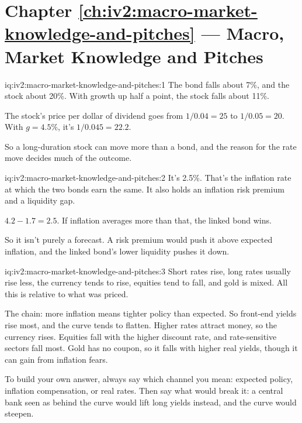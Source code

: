 \section*{Chapter \ref{ch:iv2:macro-market-knowledge-and-pitches} --- Macro, Market Knowledge and Pitches}

\begin{solution}{iq:iv2:macro-market-knowledge-and-pitches:1}
The bond falls about 7\%, and the stock about 20\%. With growth up half a point, the stock falls about 11\%.

The stock's price per dollar of dividend goes from $1/0.04 = 25$ to $1/0.05 = 20$. With $g = 4.5\%$, it's $1/0.045 = 22.2$.

So a long-duration stock can move more than a bond, and the reason for the rate move decides much of the outcome.

\end{solution}

\begin{solution}{iq:iv2:macro-market-knowledge-and-pitches:2}
It's 2.5\%. That's the inflation rate at which the two bonds earn the same. It also holds an inflation risk premium and a liquidity gap.

$4.2 - 1.7 = 2.5$. If inflation averages more than that, the linked bond wins.

So it isn't purely a forecast. A risk premium would push it above expected inflation, and the linked bond's lower liquidity pushes it down.

\end{solution}

\begin{solution}{iq:iv2:macro-market-knowledge-and-pitches:3}
Short rates rise, long rates usually rise less, the currency tends to rise, equities tend to fall, and gold is mixed. All this is relative to what was priced.

The chain: more inflation means tighter policy than expected. So front-end yields rise most, and the curve tends to flatten. Higher rates attract money, so the currency rises. Equities fall with the higher discount rate, and rate-sensitive sectors fall most. Gold has no coupon, so it falls with higher real yields, though it can gain from inflation fears.

To build your own answer, always say which channel you mean: expected policy, inflation compensation, or real rates. Then say what would break it: a central bank seen as behind the curve would lift long yields instead, and the curve would steepen.

\end{solution}

